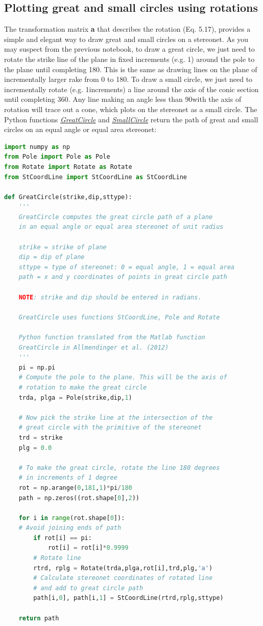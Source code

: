 \documentclass[a4paper , 12pt]{book}
\begin{document}
\subsection{Plotting great and small circles using rotations}

The transformation matrix \textbf{a} that describes the rotation (Eq. 5.17), provides a simple and elegant way to draw great and small circles on a stereonet. As you may suspect from the previous notebook, to draw a great circle, we just need to rotate the strike line of the plane in fixed increments (e.g. 1\degree) around the pole to the plane until completing 180\degree. This is the same as drawing lines on the plane of incrementally larger rake from 0 to 180\degree. To draw a small circle, we just need to incrementally rotate (e.g. 1\degree increments) a line around the axis of the conic section until completing 360\degree. Any line making an angle less than 90\degree with the axis of rotation will trace out a cone, which plots on the stereonet as a small circle. The Python functions \href{http://github.com}{\textit{GreatCircle}} and \href{http://github.com}{\textit{SmallCircle}} return the path of great and small circles on an equal angle or equal area stereonet:

\begin{lstlisting}[language=Python, frame=single]
import numpy as np
from Pole import Pole as Pole
from Rotate import Rotate as Rotate
from StCoordLine import StCoordLine as StCoordLine

def GreatCircle(strike,dip,sttype):
    '''
	GreatCircle computes the great circle path of a plane 
	in an equal angle or equal area stereonet of unit radius
	
	strike = strike of plane
	dip = dip of plane
	sttype = type of stereonet: 0 = equal angle, 1 = equal area
	path = x and y coordinates of points in great circle path
	
	NOTE: strike and dip should be entered in radians. 
	
	GreatCircle uses functions StCoordLine, Pole and Rotate
	
	Python function translated from the Matlab function
	GreatCircle in Allmendinger et al. (2012)
	'''
    pi = np.pi
	# Compute the pole to the plane. This will be the axis of 
	# rotation to make the great circle
    trda, plga = Pole(strike,dip,1)
    
	# Now pick the strike line at the intersection of the 
    # great circle with the primitive of the stereonet
    trd = strike
    plg = 0.0
    
	# To make the great circle, rotate the line 180 degrees 
	# in increments of 1 degree
    rot = np.arange(0,181,1)*pi/180
    path = np.zeros((rot.shape[0],2))
    
    for i in range(rot.shape[0]):
	# Avoid joining ends of path
        if rot[i] == pi:
            rot[i] = rot[i]*0.9999
		# Rotate line
        rtrd, rplg = Rotate(trda,plga,rot[i],trd,plg,'a')
		# Calculate stereonet coordinates of rotated line 
		# and add to great circle path
        path[i,0], path[i,1] = StCoordLine(rtrd,rplg,sttype)
    
    return path
\end{lstlisting}
\end{document}
